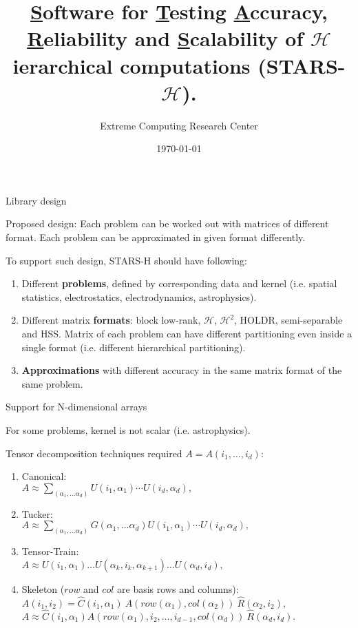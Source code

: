 \documentclass{beamer}
\title[STARS-$\mathcal{H}$]{\underline{S}oftware for \underline{T}esting
\underline{A}ccuracy, \underline{R}eliability and \underline{S}calability of
$\mathcal{H}$ierarchical computations (STARS-$\mathcal{H}$).}
\author{Extreme Computing Research Center}
\institute{King Abdullah University of Science and Technology}
\date{\today}
\begin{document}
\begin{frame}
\titlepage
\end{frame}

\begin{frame}{Library design}
\begin{block}{Proposed design:}
Each problem can be worked out with matrices of different format. Each problem
can be approximated in given format differently.
\end{block}
To support such design, STARS-H should have following:
\begin{enumerate}
\item Different \textbf{problems}, defined by corresponding data and kernel
(i.e. spatial statistics, electrostatics, electrodynamics, astrophysics).
\item Different matrix \textbf{formats}: block low-rank, $\mathcal{H}$,
$\mathcal{H}^2$, HOLDR, semi-separable and HSS. Matrix of each problem can have
different partitioning even inside a single format (i.e. different hierarchical
partitioning).
\item \textbf{Approximations} with different accuracy in the same matrix format
of the same problem.
\end{enumerate}
\end{frame}

\begin{frame}{Support for N-dimensional arrays}
\begin{block}{}
For some problems, kernel is not scalar (i.e. astrophysics).
\end{block}
Tensor decomposition techniques required $A = A(i_1, \ldots, i_d)$:
\begin{enumerate}
\item Canonical:\\
$A \approx \sum_{(\alpha_1, \ldots \alpha_d)}
U(i_1, \alpha_1) \cdots U(i_d, \alpha_d),$
\item Tucker:\\
$A \approx \sum_{(\alpha_1, \ldots \alpha_d)}
G(\alpha_1, \ldots \alpha_d) U(i_1, \alpha_1) \cdots U(i_d, \alpha_d),$
\item Tensor-Train:\\
$A \approx U(i_1, \alpha_1) \ldots U(\alpha_k, i_k,
\alpha_{k+1}) \ldots U(\alpha_d, i_d),$
\item Skeleton ($row$ and $col$ are basis rows and columns):
$A(i_1, i_2) = \hat{C}(i_1, \alpha_1)\ 
A(row(\alpha_1), col(\alpha_2)) \ \hat{R}(\alpha_2, i_2),$\\
$A \approx \hat{C}(i_1, \alpha_1) A(row(\alpha_1), i_2,
\ldots, i_{d-1}, col(\alpha_d)) \ \hat{R}(\alpha_d, i_d).$
\end{enumerate}
\end{frame}
\end{document}
